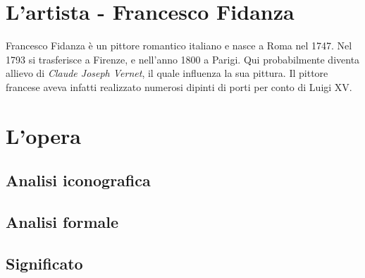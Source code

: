 \documentclass{article}
\begin{document}
\section{L'artista - Francesco Fidanza}
Francesco Fidanza è un pittore romantico italiano e nasce a Roma nel 1747. Nel 1793 si trasferisce a Firenze, e nell'anno 1800 a Parigi. Qui probabilmente diventa allievo di \textit{Claude Joseph Vernet}, il quale influenza la sua pittura. Il pittore francese aveva infatti realizzato numerosi dipinti di porti per conto di Luigi XV.

\section{L'opera}
\subsection{Analisi iconografica}
\subsection{Analisi formale}
\subsection{Significato}
\end{document}
